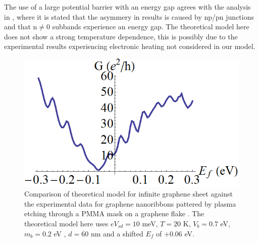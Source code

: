 \documentclass[prl,twocolumn,aps,superscriptaddress,floatfix,10pt]{revtex4}
\begin{document}
	The use of a large potential barrier with an energy gap agrees with the analysis in \cite{b11}, where it is stated that the asymmery in results is caused by np/pn junctions and that n$\neq$0 subbands experience an energy gap. The theoretical model here does not show a strong temperature dependence, this is possibly due to the experimental results experiencing electronic heating not considered in our model.
\begin{figure}
	\includegraphics[scale=0.2]{exp-b-flat}
	\caption{Comparison of theoretical model for infinite graphene sheet against the experimental data for graphene nanoribbons pattered by plasma etching through a PMMA mask on a graphene flake \cite{b14}. The theoretical model here uses $eV_{sd}=10$ meV, $T=20$ K, $V_{b}=0.7$ eV, $m_{b}=0.2$ eV , $d=60$ nm and a shifted $E_{f}$ of $+0.06$ eV.}
	\label{exp-b-flat}
\end{figure}
\end{document}
